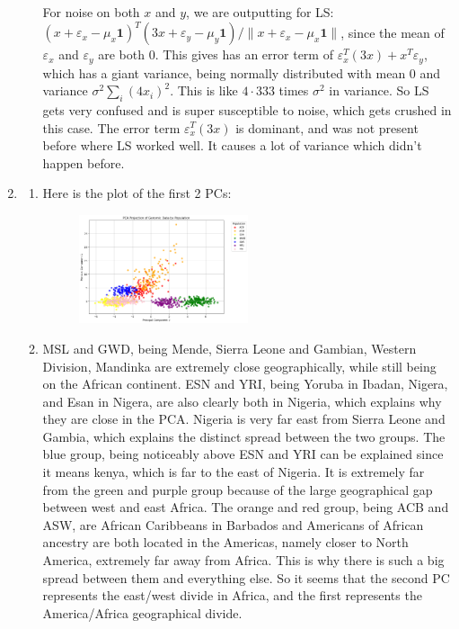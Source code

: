 \documentclass[12pt]{article}
\theoremstyle{definitionstyle}
\def \ve{\varepsilon}
\newcommand{\mg}[1]{\| #1 \|}
\begin{document}
\begin{enumerate}[leftmargin=\labelsep]
\begin{enumerate}[label=(\alph*)]
            For noise on both $x$ and $y$, we are outputting for LS: $(x + \ve_x - \mu_x \mathbf{1})^T(3x + \ve_y - \mu_y\mathbf{1}) / \mg{x + \ve_x - \mu_x\mathbf{1}}$, since the mean of $\ve_x$ and $\ve_y$ are both 0. 
            This gives has an error term of $\ve_x^T (3x) + x^T \ve_y$, which has a giant variance, being normally distributed with mean 0 and variance $\sigma^2 \sum_i (4x_i)^2$. This is like $4 \cdot 333$ times $\sigma^2$ in variance. So LS gets very confused and is super susceptible to noise, which gets crushed in this case. The error term $\ve_x^T(3x)$ is dominant, and was not present before where LS worked well. It causes a lot of variance which didn't happen before.
        \end{enumerate}
        \item \begin{enumerate}[label=(\alph*)]
            \item Here is the plot of the first 2 PCs:
            \begin{figure}[H]
                \centering
                \includegraphics[width=0.5\textwidth]{2_pcs.png}
            \end{figure}
            \item MSL and GWD, being Mende, Sierra Leone and Gambian, Western Division, Mandinka are extremely close geographically, while still being on the African continent. ESN and YRI, being Yoruba in Ibadan, Nigera, and Esan in Nigera, are also clearly both in Nigeria, which explains why they are close in the PCA. Nigeria is very far east from Sierra Leone and Gambia, which explains the distinct spread between the two groups. The blue group, being noticeably above ESN and YRI can be explained since it means kenya, which is far to the east of Nigeria. It is extremely far from the green and purple group because of the large geographical gap between west and east Africa.
            The orange and red group, being ACB and ASW, are African Caribbeans in Barbados and Americans of African ancestry are both located in the Americas, namely closer to North America, extremely far away from Africa. This is why there is such a big spread between them and everything else. So it seems that the second PC represents the east/west divide in Africa, and the first represents the America/Africa geographical divide.


\end{enumerate}
\end{enumerate}
\end{document}
